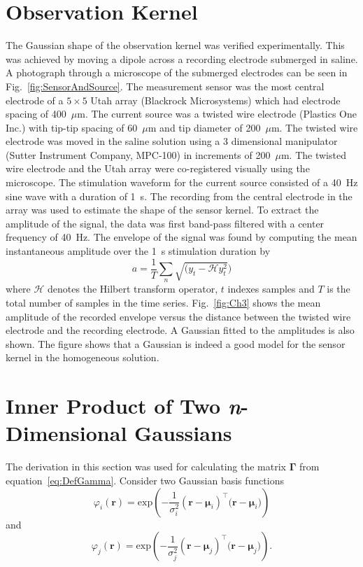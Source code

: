 \documentclass[5p,authoryear]{elsarticle}
\begin{document}
\section{Observation Kernel}\label{App:ObsKernelExperiment}
The Gaussian shape of the observation kernel was verified experimentally. This was achieved by moving a dipole across a recording electrode submerged in saline. A photograph through a microscope of the submerged electrodes can be seen in Fig.~\ref{fig:SensorAndSource}. The measurement sensor was the most central electrode of a $5\times5$ Utah array (Blackrock Microsystems) which had electrode spacing of 400~$\mu$m. The current source was a twisted wire electrode (Plastics One Inc.) with tip-tip spacing of 60~$\mu$m and tip diameter of 200~$\mu$m. The twisted wire electrode was moved in the saline solution using a 3 dimensional manipulator (Sutter Instrument Company, MPC-100) in increments of 200~$\mu$m. The twisted wire electrode and the Utah array were co-registered visually using the microscope.
The stimulation waveform for the current source consisted of a 40~Hz sine wave with a duration of 1~s. The recording from the central electrode in the array was used to estimate the shape of the sensor kernel. To extract the amplitude of the signal, the data was first band-pass filtered with a center frequency of 40~Hz. The envelope of the signal was found by computing the mean instantaneous amplitude over the 1~s stimulation duration by
\begin{equation}
	a = \frac{1}{T}\sum_n{\sqrt{(y_t-\mathcal{H}y_t^2})}
\end{equation}
where $\mathcal{H}$ denotes the Hilbert transform operator, $t$ indexes samples and $T$ is the total number of samples in the time series. Fig.~\ref{fig:Ch3} shows the mean amplitude of the recorded envelope versus the distance between the twisted wire electrode and the recording electrode. A Gaussian fitted to the amplitudes is also shown. The figure shows that a Gaussian is indeed a good model for the sensor kernel in the homogeneous solution.
\section{Inner Product of Two \emph{n}-Dimensional Gaussians}\label{App:InnerProdOfGaussians}
The derivation in this section was used for calculating the matrix $\mathbf \Gamma$ from equation~\ref{eq:DefGamma}. Consider two Gaussian basis functions
\begin{equation}\label{eq:n_dimensional_Gaussian1}
 \varphi_i(\mathbf r)=\mathrm{exp}\left({-\frac{1}{\sigma_i^2} (\mathbf r-\boldsymbol \mu_i)^\top(\mathbf r-\boldsymbol \mu_i})\right)
\end{equation}
and 
\begin{equation}\label{eq:n_dimensional_Gaussian2}
\varphi_j(\mathbf r)=\mathrm{exp}\left({-\frac{1}{\sigma_j^2} (\mathbf r-\boldsymbol \mu_j)^\top(\mathbf r-\boldsymbol \mu_j})\right).
\end{equation}
\end{document}
